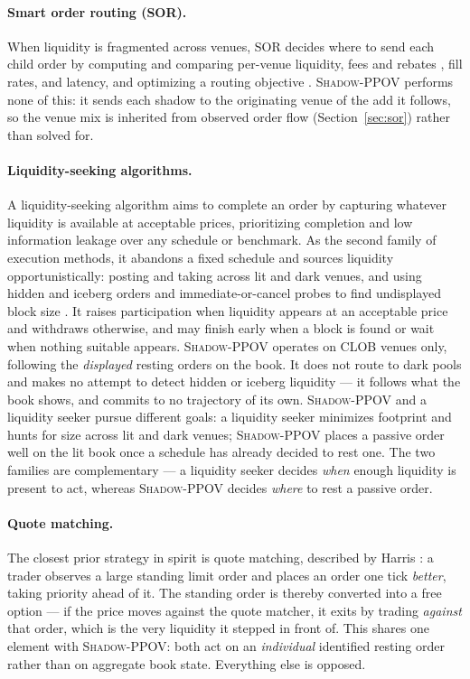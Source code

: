 \documentclass[11pt]{article}
\newcommand{\pov}{\textsc{Shadow-PPOV}}
\begin{document}
\paragraph{Smart order routing (SOR).} When liquidity is fragmented across
venues, SOR decides where to send each child order by computing and comparing
per-venue liquidity, fees and rebates \cite{battalio2016}, fill rates, and
latency, and optimizing a routing objective
\cite{foucault2008,laruelle2011,contkukanov2015}. \pov{} performs none of this: it sends each shadow to the
originating venue of the add it follows, so the venue mix is inherited from
observed order flow (Section~\ref{sec:sor}) rather than solved for.

\paragraph{Liquidity-seeking algorithms.} A liquidity-seeking algorithm aims to
complete an order by capturing whatever liquidity is available at acceptable
prices, prioritizing completion and low information leakage over any schedule or
benchmark. As the second family of execution methods, it abandons a fixed schedule
and sources liquidity opportunistically: posting and taking across lit and dark
venues, and using hidden and iceberg orders and immediate-or-cancel probes to
find undisplayed block size \cite{kissell,laruelle2011}. It raises
participation when liquidity appears at an acceptable price and withdraws
otherwise, and may finish early when a block is found or wait when nothing
suitable appears. \pov{} operates on CLOB
venues only, following the \emph{displayed} resting orders on the book. It does
not route to dark pools and makes no attempt to detect hidden or iceberg
liquidity --- it follows what the book shows, and commits to no trajectory of
its own. \pov{} and a liquidity seeker pursue different goals: a liquidity
seeker minimizes footprint and hunts for size across lit and
dark venues; \pov{} places a passive order well on the lit book once a schedule
has already decided to rest one. The two families are complementary --- a
liquidity seeker decides \emph{when} enough liquidity is present
to act, whereas \pov{} decides \emph{where} to rest a passive order.

\paragraph{Quote matching.} The closest prior strategy in spirit is quote
matching, described by Harris \cite{harris2003}: a trader observes a large
standing limit order and places an order one tick \emph{better}, taking priority
ahead of it. The standing order is thereby converted into a free option --- if
the price moves against the quote matcher, it exits by trading \emph{against}
that order, which is the very liquidity it stepped in front of. This shares one
element with \pov{}: both act on an \emph{individual} identified resting order
rather than on aggregate book state. Everything else is opposed.
\end{document}
